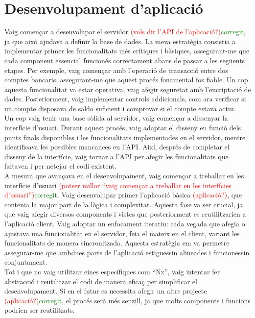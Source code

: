 \documentclass[a4paper,12pt,twoside]{ThesisStyle}
\newcommand{\pau}[1]{\textcolor{red}{#1}}
\newcommand{\sudan}[1]{\textcolor{green}{#1}}
\begin{document}
\section{Desenvolupament d'aplicació}
\label{sec: desenvolupament d'aplicació }

Vaig començar a desenvolupar el servidor \pau{(vols dir l'API de l'aplicació?)}\sudan{corregit}, ja que això ajudava a definir la base de dades. La meva estratègia consistia a implementar primer les funcionalitats més crítiques i bàsiques, assegurant-me que cada component essencial funcionés correctament abans de passar a les següents etapes. Per exemple, vaig començar amb l'operació de transacció entre dos comptes bancaris, assegurant-me que aquest procés fonamental fos fiable. Un cop aquesta funcionalitat va estar operativa, vaig afegir seguretat amb l'encriptació de dades. Posteriorment, vaig implementar controls addicionals, com ara verificar si un compte disposava de saldo suficient i comprovar si el compte estava actiu.\\

Un cop vaig tenir una base sòlida al servidor, vaig començar a dissenyar la interfície d'usuari. Durant aquest procés, vaig adaptar el disseny en funció dels punts finals disponibles i les funcionalitats implementades en el servidor, mentre identificava les possibles mancances en l'API. Així, després de completar el disseny de la interfície, vaig tornar a l'API per afegir les funcionalitats que faltaven i per netejar el codi existent.\\

A mesura que avançava en el desenvolupament, vaig començar a treballar en les interfície d'usuari \pau{(potser millor ``vaig començar a treballar en les interfícies d'usuari'')}\sudan{corregit}. Vaig desenvolupar primer l'aplicació bàsica \pau{(aplicació?)}, que contenia la major part de la lògica i complexitat. Aquesta fase va ser crucial, ja que vaig afegir diversos components i vistes que posteriorment es reutilitzarien a l'aplicació client. Vaig adoptar un enfocament iteratiu: cada vegada que afegia o ajustava una funcionalitat en el servidor, feia el mateix en el client, variant les funcionalitats de manera sincronitzada. Aquesta estratègia em va permetre assegurar-me que ambdues parts de l'aplicació estiguessin alineades i funcionessin conjuntament.\\

Tot i que no vaig utilitzar eines específiques com ``Nx'', vaig intentar fer abstracció i reutilitzar el codi de manera eficaç per simplificar el desenvolupament. Si en el futur es necessita afegir un altre projecte \pau{(aplicació?)}\sudan{corregit}, el procés serà més senzill, ja que molts components i funcions podrien ser reutilitzats.
\end{document}
